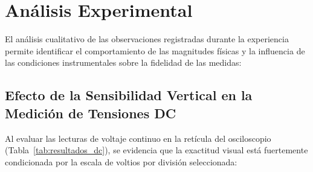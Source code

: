 
\section{Análisis Experimental}
\label{sec:analisis_exp}

El análisis cualitativo de las observaciones registradas durante la experiencia permite identificar el comportamiento de las magnitudes físicas y la influencia de las condiciones instrumentales sobre la fidelidad de las medidas:

\subsection{Efecto de la Sensibilidad Vertical en la Medición de Tensiones DC}
Al evaluar las lecturas de voltaje continuo en la retícula del osciloscopio (Tabla~\ref{tab:resultados_dc}), se evidencia que la exactitud visual está fuertemente condicionada por la escala de voltios por división seleccionada:
